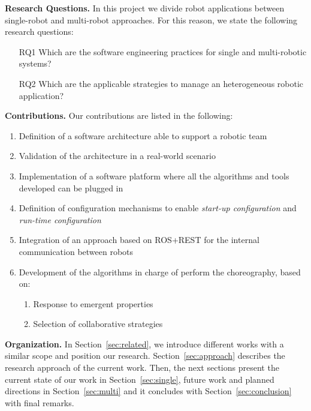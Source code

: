 \textbf{Research Questions.} 
In this project we divide robot applications between single-robot and multi-robot approaches.
For this reason, we state the following research questions:
\begin{itemize}
\item[RQ1] Which are the software engineering practices for single and multi-robotic systems? 
\item[RQ2] Which are the applicable strategies to manage an heterogeneous robotic application?
\end{itemize}

\textbf{Contributions.} 
Our contributions are listed in the following:

\begin{enumerate}
\item Definition of a software architecture able to support a robotic team
\item Validation of the architecture in a real-world scenario
\item Implementation of a software platform where all the algorithms and tools developed can be plugged in 
\item Definition of configuration mechanisms to enable \emph{start-up configuration} and \emph{run-time configuration}
\item Integration of an approach based on ROS+REST for the internal communication between robots
\item Development of the algorithms in charge of perform the choreography, based on:
\begin{enumerate}
\item Response to emergent properties
\item Selection of collaborative strategies
\end{enumerate}
\end{enumerate}

\textbf{Organization.} 
In Section~\ref{sec:related}, we introduce different works with a similar scope and position our research.
Section~\ref{sec:approach} describes the research approach of the current work.
Then, the next sections present the current state of our work in Section~\ref{sec:single}, future work and planned directions in Section~\ref{sec:multi} and it concludes with Section~\ref{sec:conclusion} with final remarks.